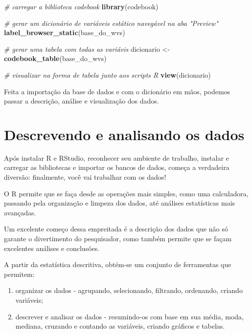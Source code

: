 \documentclass[
  10pt,
  brazil,
  a4paper,
  twoside, notitlepage, openright]{book}
\newenvironment{Shaded}{\begin{snugshade}}{\end{snugshade}}
\newcommand{\CommentTok}[1]{\textcolor[rgb]{0.56,0.35,0.01}{\textit{#1}}}
\newcommand{\KeywordTok}[1]{\textcolor[rgb]{0.13,0.29,0.53}{\textbf{#1}}}
\newcommand{\NormalTok}[1]{#1}
\newcommand{\StringTok}[1]{\textcolor[rgb]{0.31,0.60,0.02}{#1}}
\providecommand{\tightlist}{%
  \setlength{\itemsep}{0pt}\setlength{\parskip}{0pt}}
\begin{document}
\begin{Shaded}
\begin{Highlighting}[]
\CommentTok{# carregar a biblioteca codebook}
\KeywordTok{library}\NormalTok{(codebook)}

\CommentTok{# gerar um dicionário de variáveis estático navegável na aba "Preview"}
\KeywordTok{label_browser_static}\NormalTok{(base_do_wvs)}

\CommentTok{# gerar uma tabela com todas as variávis}
\NormalTok{dicionario <-}\StringTok{ }\KeywordTok{codebook_table}\NormalTok{(base_do_wvs)}

\CommentTok{# visualizar na forma de tabela junto aos scripts R}
\KeywordTok{view}\NormalTok{(dicionario)}
\end{Highlighting}
\end{Shaded}

Feita a importação da base de dados e com o dicionário em mãos, podemos passar a descrição, análise e visualização dos dados.

\hypertarget{descrevendo-e-analisando-os-dados}{%
\chapter{Descrevendo e analisando os dados}\label{descrevendo-e-analisando-os-dados}}

Após instalar R e RStudio, reconhecer seu ambiente de trabalho, instalar e carregar as bibliotecas e importar os bancos de dados, começa a verdadeira diversão: finalmente, você vai trabalhar com os dados!

O R permite que se faça desde as operações mais simples, como uma calculadora, passando pela organização e limpeza dos dados, até análises estatísticas mais avançadas.

Um excelente começo dessa empreitada é a descrição dos dados que não só garante o divertimento do pesquisador, como também permite que se façam excelentes análises e conclusões.

A partir da estatística descritiva, obtém-se um conjunto de ferramentas que permitem:

\begin{enumerate}
\def\labelenumi{\alph{enumi})}
\tightlist
\item
  organizar os dados - agrupando, selecionando, filtrando, ordenando, criando variáveis;\\
\item
  descrever e analisar os dados - resumindo-os com base em sua média, moda, mediana, cruzando e contando as variáveis, criando gráficos e tabelas.
\end{enumerate}
\end{document}
